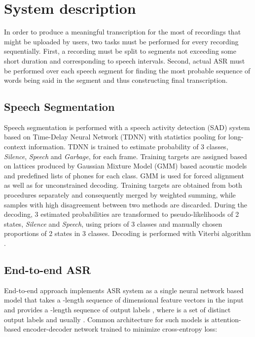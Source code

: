 \documentclass[12pt,a4paper]{article}
\begin{document}
\section{System description}

In order to produce a meaningful transcription for the most
of recordings that might be uploaded by users,
two tasks must be performed for every recording sequentially.
First, a recording must be split to segments
not exceeding some short duration and corresponding to speech intervals.
Second, actual ASR must be performed over each speech segment
for finding the most probable sequence of words being said
in the segment and thus constructing final transcription.

\subsection{Speech Segmentation}

Speech segmentation is performed with a speech activity detection (SAD)
system based on Time-Delay Neural Network (TDNN) \cite{waibel1990phoneme}
with statistics pooling \cite{ghahremani2016acoustic} for long-context information.
TDNN is trained to estimate probability of 3 classes,
\textit{Silence}, \textit{Speech} and \textit{Garbage},
for each frame. Training targets are assigned based on lattices 
produced by  Gaussian Mixture Model (GMM) based acoustic models and predefined lists
of phones for each class. GMM is used for forced alignment
as well as for unconstrained decoding. Training targets
are obtained from both procedures separately and consequently
merged by weighted summing, while samples with high disagreement
between two methods are discarded.
During the decoding, 3 estimated probabilities are transformed
to pseudo-likelihoods of 2 states, \textit{Silence} and \textit{Speech},
using priors of 3 classes and manually chosen proportions of 2 states in 3 classes.
Decoding is performed with Viterbi algorithm \cite{viterbi1967error}.

\subsection{End-to-end ASR}

End-to-end approach implements ASR system as
a single neural network based model that takes a -length sequence of
 dimensional feature vectors  in the input
and provides a -length sequence
of output labels ,
where  is a set of distinct output labels
and usually .
Common architecture for such models is attention-based encoder-decoder network
trained to minimize cross-entropy loss:
\end{document}
